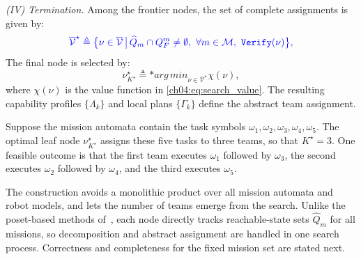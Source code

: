 \emph{(IV) Termination.}
 Among the frontier nodes, the set of complete
assignments is given by:
\begin{equation}
\color{blue}
\label{ch04:eq:complete-nodes}
\overline{\mathcal{V}}^\star \triangleq
\bigl\{
\nu\in\overline{\mathcal{V}} \,\big|\,
\widehat{Q}_m\cap Q_F^m\neq\emptyset,\ \forall m\in\mathcal{M},\ \texttt{Verify}(\nu)
\bigr\},
\end{equation}
The final node is selected by:
\begin{equation}
\label{ch04:eq:termination}
\nu_{K^\star}^\star \triangleq
\texttt*{arg\,min}_{\nu\in\overline{\mathcal{V}}^\star}\chi(\nu),
\end{equation}
where $\chi(\nu)$ is the value function in
\eqref{ch04:eq:search_value}. The resulting capability profiles
$\{\Lambda_k\}$ and local plans $\{\Gamma_k\}$ define the abstract team
assignment.

\begin{example}
\label{ch04:example:task-decomp}
Suppose the mission automata
contain the task symbols
$\omega_1,\omega_2,\omega_3,\omega_4,\omega_5$. The optimal leaf node
$\nu_{K^\star}^\star$ assigns these five tasks to three teams, so that
$K^\star=3$. One feasible outcome is that the first team executes
$\omega_1$ followed by $\omega_3$, the second executes $\omega_2$ followed by
$\omega_4$, and the third executes $\omega_5$.
\end{example}

The construction avoids a monolithic product over all mission automata and robot
models, and lets the number of teams emerge from the search. Unlike the
poset-based methods of~\citet{liu2024time,luo2025hulk}, each node directly tracks
reachable-state sets $\widehat{Q}_m$ for all missions, so decomposition and
abstract assignment are handled in one search process. Correctness and
completeness for the fixed mission set are stated next.


